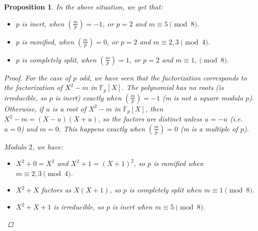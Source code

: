 \documentclass[11pt]{article}
\newtheorem{prop}{Proposition}
\theoremstyle{definition}
\begin{document}
    \begin{prop}

        In the above situation, we get that:

        \begin{itemize}
            \item $p$ is inert, when $\left(\frac{m}{p}\right) = -1$, or $p=2$ and $m \equiv 5 \pmod 8$.
            \item $p$ is ramified, when $\left(\frac{m}{p}\right) = 0$, or $p=2$ and $m \equiv 2, 3 \pmod 4$.
            \item $p$ is completely split, when $\left(\frac{m}{p}\right) = 1$, or $p=2$ and $m \equiv 1, \pmod 8$.
        \end{itemize}
        
        \begin{proof}
            For the case of $p$ odd, we have seen that the factorization corresponds to the factorization of $X^2-m$ in $\mathbb{F}_p[X]$.
            The polynomial has no roots (is irreducible, so $p$ is inert) exactly when $\left(\frac{m}{p}\right) = -1$ (m is not a square modulo $p$).
            Otherwise, if $u$ is a root of $X^2-m$ in $\mathbb{F}_p[X]$, then $X^2-m = (X-u)(X+u)$, so the factors are distinct unless $u = -u$ (i.e. $u = 0$) and $m = 0$.
            This happens exactly when $\left(\frac{m}{p}\right) = 0$ (m is a multiple of $p$).

            \textcolor{white}{}

            \noindent Modulo $2$, we have:
            \begin{itemize}
                \item $X^2+0 = X^2$ and  $X^2+1 = (X+1)^2$, so $p$ is ramified when $m \equiv 2, 3 \pmod 4$.
                \item $X^2+X$ factors as $X(X+1)$, so $p$ is completely split when $m \equiv 1 \pmod 8$.
                \item $X^2+X+1$ is irreducible, so $p$ is inert when $m \equiv 5 \pmod 8$.
            \end{itemize}
        \end{proof}
    \end{prop}
\end{document}
